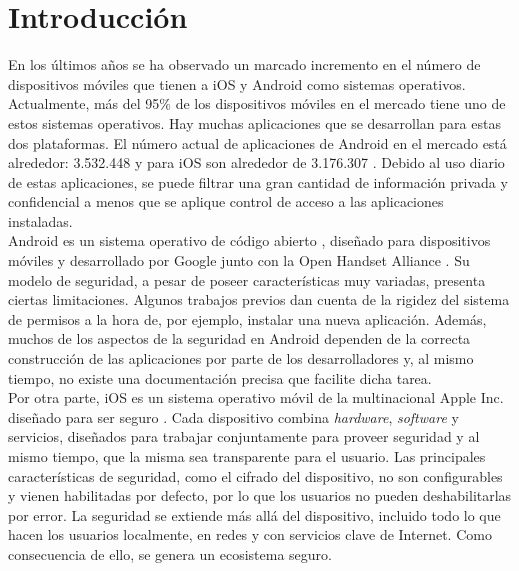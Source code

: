 \chapter*{Introducción}
En los últimos años se ha observado un marcado incremento en el número de dispositivos móviles
que tienen a iOS y Android como sistemas operativos. Actualmente, más del 95\% de los dispositivos móviles en el mercado tiene uno de estos sistemas operativos. Hay muchas aplicaciones que se desarrollan para estas dos plataformas. El número actual de aplicaciones de Android en el mercado está alrededor: 3.532.448 \cite{ASM} y para iOS son alrededor de 3.176.307 \cite{ASM}. Debido al uso diario de estas aplicaciones, se puede filtrar una gran cantidad de información privada y confidencial a menos que se aplique control de acceso a las aplicaciones instaladas.\\

Android \cite{aos} es un sistema operativo de código abierto \cite{aosp}, diseñado para dispositivos móviles y desarrollado por Google junto con la Open Handset Alliance \cite{oha}. Su modelo de seguridad, a pesar de poseer características muy variadas, presenta ciertas limitaciones. Algunos trabajos previos dan cuenta de la rigidez del sistema de permisos a la hora de, por ejemplo, instalar una nueva aplicación. Además, muchos de los aspectos de la seguridad en Android dependen de la correcta construcción de las aplicaciones por parte de los desarrolladores y, al mismo tiempo, no existe una documentación precisa que facilite dicha tarea.\\

Por otra parte, iOS es un sistema operativo móvil de la multinacional Apple Inc. diseñado para ser seguro \cite{asg}. Cada dispositivo combina \emph{hardware}, \emph{software} y servicios, diseñados para trabajar conjuntamente para proveer seguridad y al mismo tiempo, que la misma sea transparente para el usuario. Las principales características de seguridad, como el cifrado del dispositivo, no son configurables y vienen habilitadas por defecto, por lo que los usuarios no pueden deshabilitarlas por error. La seguridad se extiende más allá del dispositivo, incluido todo lo que hacen los usuarios localmente, en redes y con servicios clave de Internet. Como consecuencia de ello, se genera un ecosistema seguro.\\

